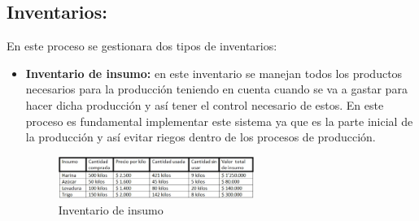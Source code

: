 \subsection{Inventarios:} En este proceso se gestionara dos tipos de inventarios:
	\begin{itemize}
		\item \textbf{Inventario de insumo:} en este inventario se manejan todos los productos necesarios para la producci\'on teniendo en cuenta cuando se va a gastar  para hacer dicha producci\'on y as\'i tener el control necesario de estos. En este proceso es fundamental implementar este sistema ya que es la parte inicial de la producci\'on y as\'i evitar riegos dentro de los procesos de producci\'on.
\begin{figure}[htbp]
	\centering
		\includegraphics[width=0.60\textwidth]{images/Inventarioinsumo.jpg}
	\caption{Inventario de insumo}
	\label{fig:Inventariodeinsumo}
\end{figure}%
%	
	

\end{itemize}
